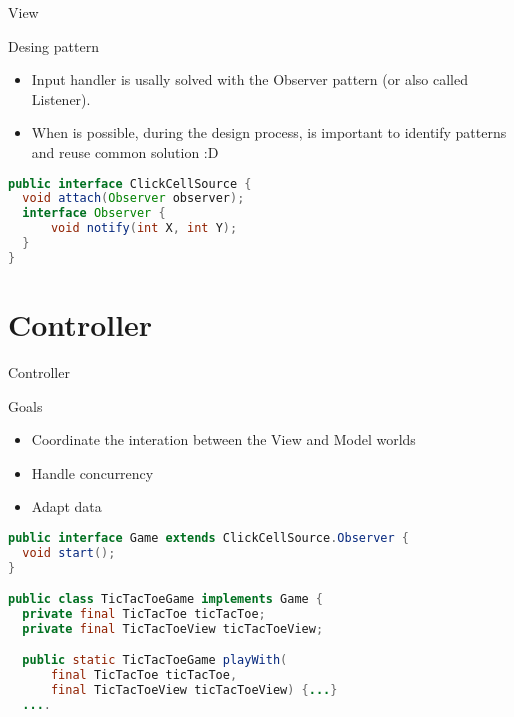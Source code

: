 \documentclass[presentation]{beamer}
\let\oldcite\cite
\renewcommand{\cite}[1]{{\color{blue}\oldcite{#1}}}
\begin{document}
\begin{frame}[fragile]{View}
\begin{block}{Desing pattern}
  \begin{itemize}
    \item Input handler is usally solved with the Observer \cite{gamma1995design} pattern (or also called Listener). 
    \item When is possible, during the design process, is important to identify patterns and reuse common solution :D
  \end{itemize}
\end{block}
\begin{lstlisting}[language=Java]
public interface ClickCellSource {
  void attach(Observer observer);
  interface Observer {
      void notify(int X, int Y);
  }
}
\end{lstlisting}
\end{frame}

\section{Controller}
\begin{frame}[fragile]{Controller}
\begin{block}{Goals}
  \begin{itemize}
    \item Coordinate the interation between the View and Model worlds
    \item Handle concurrency
    \item Adapt data 
  \end{itemize}
\end{block}

\begin{lstlisting}[language=Java]
public interface Game extends ClickCellSource.Observer {
  void start();
}

public class TicTacToeGame implements Game {
  private final TicTacToe ticTacToe;
  private final TicTacToeView ticTacToeView;

  public static TicTacToeGame playWith(
      final TicTacToe ticTacToe, 
      final TicTacToeView ticTacToeView) {...}
  ....

\end{lstlisting}
\end{frame}
\end{document}
